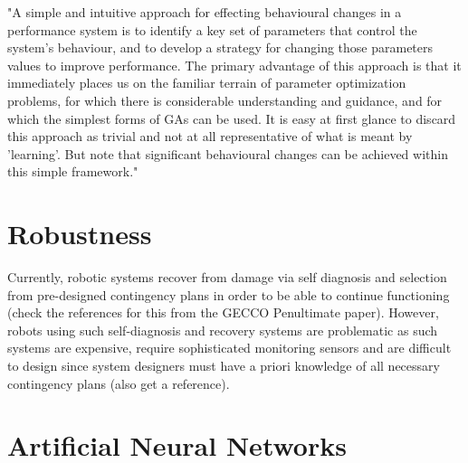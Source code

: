 "A simple and intuitive approach for effecting behavioural changes in a performance system is to identify a key set of parameters that control the system's behaviour, and to develop a strategy for changing those parameters values to improve performance. The primary advantage of this approach is that it immediately places us on the familiar terrain of parameter optimization problems, for which there is considerable understanding and guidance, and for which the simplest forms of GAs can be used. It is easy at first glance to discard this approach as trivial and not at all representative of what is meant by 'learning'. But note that significant behavioural changes can be achieved within this simple framework."




\section{Robustness}

Currently, robotic systems recover from damage via self diagnosis and selection from pre-designed contingency plans in order to be able to continue functioning (check the references for this from the GECCO Penultimate paper). However, robots using such self-diagnosis and recovery systems are problematic as such systems are expensive, require sophisticated monitoring sensors and are difficult to design since system designers must have a priori knowledge of all necessary contingency plans (also get a reference).


\section{Artificial Neural Networks}


